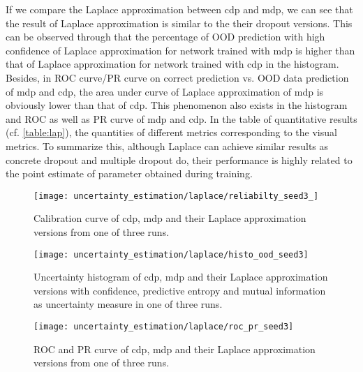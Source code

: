 If we compare the Laplace approximation between cdp and mdp, we can see that the result of Laplace approximation is similar to the their dropout versions. This can be observed through that the percentage of OOD prediction with high confidence of Laplace approximation for network trained with mdp is higher than that of Laplace approximation for network trained with cdp in the histogram. Besides, in ROC curve/PR curve on correct prediction vs. OOD data prediction of mdp and cdp, the area under curve of Laplace approximation of mdp is obviously lower than that of cdp. This phenomenon also exists in the histogram and ROC as well as PR curve of mdp and cdp. In the table of quantitative results (cf. \ref{table:lap}), the quantities of different metrics corresponding to the visual metrics. To summarize this, although Laplace can achieve similar results as concrete dropout and multiple dropout do, their performance is highly related to the point estimate of parameter obtained during training.

\begin{figure}[H]
	\begin{center}
		\texttt{[image: uncertainty\_estimation/laplace/reliabilty\_seed3\_]}
		\caption{Calibration curve of cdp, mdp and their Laplace approximation versions from one of three runs.}		
		\label{lap_calibration}
	\end{center}
\end{figure}

\begin{figure}[h!]		
	\centering
	\texttt{[image: uncertainty\_estimation/laplace/histo\_ood\_seed3]}
	\caption{Uncertainty histogram of cdp, mdp and their Laplace approximation versions with confidence, predictive entropy and mutual information as uncertainty measure in one of three runs.}
	\label{figure:lap_hist}	
\end{figure}


\begin{figure}[H]
	\begin{center}
		\texttt{[image: uncertainty\_estimation/laplace/roc\_pr\_seed3]}
		\caption{ROC and PR curve of cdp, mdp and their Laplace approximation versions from one of three runs.}		
		\label{lap_roc_pr}
	\end{center}
\end{figure}

